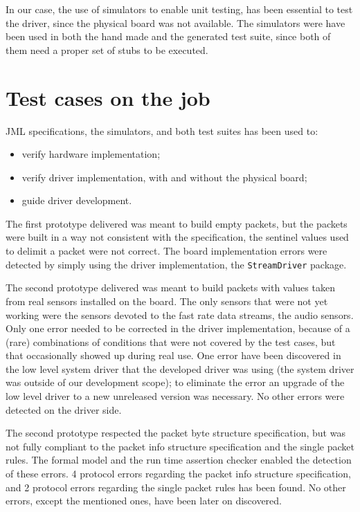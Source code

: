 \documentclass{article} \usepackage{times}
\newcommand{\lil}[1]{\texttt{\lstinline|#1|}}
\begin{document}
In our case, the use of simulators to enable unit testing, has been
essential to test the \STSB driver, since the physical board was not
available.  The simulators were have been used in both the hand made
and the generated test suite, since both of them need a proper set of
stubs to be executed.




\section{Test cases on the job}
\label{sec:test_cases_on_the_job}

JML specifications, the simulators, and both test suites has been used
to:

\begin{itemize}
\item verify hardware implementation;
\item verify driver implementation, with and without the physical
  board;
\item guide driver development.
\end{itemize}

The first \STSB prototype delivered was meant to build empty packets,
but the packets were built in a way not consistent with the
specification, the sentinel values used to delimit a packet were not
correct.  The board implementation errors were detected by simply
using the driver implementation, the \lil{StreamDriver} package.

The second prototype delivered was meant to build packets with values
taken from real sensors installed on the board.  The only sensors that
were not yet working were the sensors devoted to the fast rate data
streams, the audio sensors.  Only one error needed to be corrected in
the driver implementation, because of a (rare) combinations of
conditions that were not covered by the test cases, but that
occasionally showed up during real use.  One error have been
discovered in the low level system driver that the developed driver
was using (the system driver was outside of our development scope); to
eliminate the error an upgrade of the low level driver to a new
unreleased version was necessary.  No other errors were detected on
the driver side.

The second prototype respected the packet byte structure
specification, but was not fully compliant to the packet info
structure specification and the single packet rules.  The formal model
and the run time assertion checker enabled the detection of these
errors.  4 protocol errors regarding the packet info structure
specification, and 2 protocol errors regarding the single packet rules
has been found. No other errors, except the mentioned ones, have
been later on discovered.
\end{document}
